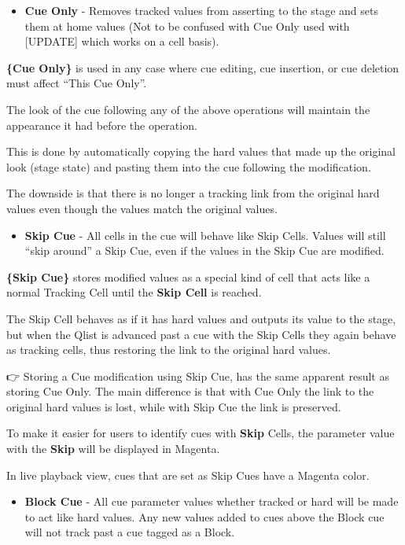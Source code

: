 \documentclass[
]{article}
\providecommand{\tightlist}{%
  \setlength{\itemsep}{0pt}\setlength{\parskip}{0pt}}
\begin{document}
\begin{itemize}
\tightlist
\item
  \textbf{Cue Only} - Removes tracked values from asserting to the stage and sets them at home values (Not to be confused with Cue Only used with {[}UPDATE{]} which works on a cell basis).
\end{itemize}

\textbf{\{Cue Only\}} is used in any case where cue editing, cue insertion, or cue deletion must affect ``This Cue Only''.

The look of the cue following any of the above operations will maintain the appearance it had before the operation.

This is done by automatically copying the hard values that made up the original look (stage state) and pasting them into the cue following the modification.

The downside is that there is no longer a tracking link from the original hard values even though the values match the original values.

\begin{itemize}
\tightlist
\item
  \textbf{Skip Cue} - All cells in the cue will behave like Skip Cells. Values will still ``skip around'' a Skip Cue, even if the values in the Skip Cue are modified.
\end{itemize}

\textbf{\{Skip Cue\}} stores modified values as a special kind of cell that acts like a normal Tracking Cell until the \textbf{Skip Cell} is reached.

The Skip Cell behaves as if it has hard values and outputs its value to the stage, but when the Qlist is advanced past a cue with the Skip Cells they again behave as tracking cells, thus restoring the link to the original hard values.

👉 Storing a Cue modification using Skip Cue, has the same apparent result as storing Cue Only. The main difference is that with Cue Only the link to the original hard values is lost, while with Skip Cue the link is preserved.

To make it easier for users to identify cues with \textbf{Skip} Cells, the parameter value with the \textbf{Skip} will be displayed in {Magenta}.

In live playback view, cues that are set as Skip Cues have a {Magenta} color.

\begin{itemize}
\tightlist
\item
  \textbf{Block Cue} - All cue parameter values whether tracked or hard will be made to act like hard values. Any new values added to cues above the Block cue will not track past a cue tagged as a Block.
\end{itemize}
\end{document}
